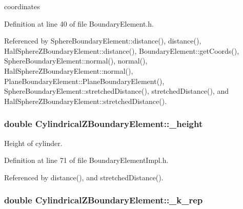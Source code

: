 coordinates 



Definition at line 40 of file Boundary\+Element.\+h.



Referenced by Sphere\+Boundary\+Element\+::distance(), distance(), Half\+Sphere\+Z\+Boundary\+Element\+::distance(), Boundary\+Element\+::get\+Coords(), Sphere\+Boundary\+Element\+::normal(), normal(), Half\+Sphere\+Z\+Boundary\+Element\+::normal(), Plane\+Boundary\+Element\+::\+Plane\+Boundary\+Element(), Sphere\+Boundary\+Element\+::stretched\+Distance(), stretched\+Distance(), and Half\+Sphere\+Z\+Boundary\+Element\+::stretched\+Distance().

\hypertarget{classCylindricalZBoundaryElement_a5227f1150dc1a7dc212cfd4387e523fc}{
\subsubsection[{\+\_\+height}]{\setlength{\rightskip}{0pt plus 5cm}double Cylindrical\+Z\+Boundary\+Element\+::\+\_\+height\hspace{0.3cm}{\ttfamily [private]}}}\label{classCylindricalZBoundaryElement_a5227f1150dc1a7dc212cfd4387e523fc}


Height of cylinder. 



Definition at line 71 of file Boundary\+Element\+Impl.\+h.



Referenced by distance(), and stretched\+Distance().

\hypertarget{classCylindricalZBoundaryElement_a4cdd06d2f2f1ac84e0ef6872c812b6cc}{
\subsubsection[{\+\_\+k\+\_\+rep}]{\setlength{\rightskip}{0pt plus 5cm}double Cylindrical\+Z\+Boundary\+Element\+::\+\_\+k\+\_\+rep\hspace{0.3cm}{\ttfamily [private]}}}\label{classCylindricalZBoundaryElement_a4cdd06d2f2f1ac84e0ef6872c812b6cc}


